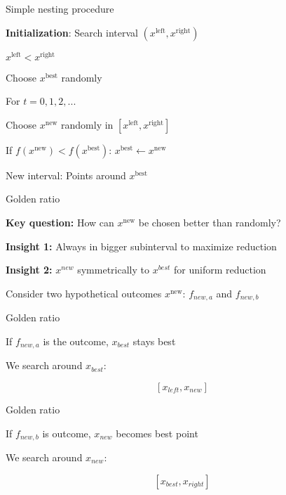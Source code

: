 \documentclass[11pt,compress,t,notes=noshow, xcolor=table]{beamer}
\begin{document}
\begin{framei}{Simple nesting procedure}
  \item \textbf{Initialization}: Search interval $(x^{\text{left}}, x^{\text{right}})$
  \item $x^{\text{left}} < x^{\text{right}}$
  \item Choose $x^{\text{best}}$ randomly
  \item For $t = 0, 1, 2, ...$
  \item Choose $x^{\text{new}}$ randomly in $[x^{\text{left}}, x^{\text{right}}]$
  \item If $f(x^{\text{new}}) < f(x^{\text{best}})$: $x^{\text{best}} \leftarrow x^{\text{new}}$
  \item New interval: Points around $x^{\text{best}}$
  \vfill
\end{framei}


\begin{framei}{Golden ratio}
  \item \textbf{Key question:} How can $x^{\text{new}}$ be chosen better than randomly?
  \item \textbf{Insight 1:} Always in bigger subinterval to maximize reduction
  \item \textbf{Insight 2:} $x^{new}$ symmetrically to $x^{best}$ for uniform reduction
  \vfill
  \vfill
  \item Consider two hypothetical outcomes $x^{\text{new}}$: $f_{new, a}$ and $f_{new, b}$
\end{framei}

\begin{framei}{Golden ratio}
  \item If $f_{new, a}$ is the outcome, $x_{best}$ stays best
  \item We search around $x_{best}$:
  \item $$[x_{left}, x_{new}]$$
  \vfill
\end{framei}

\begin{framei}{Golden ratio}
  \item If $f_{new, b}$ is outcome, $x_{new}$ becomes best point
  \item We search around $x_{new}$:
  \item $$[x_{best}, x_{right}]$$
  \vfill
\end{framei}
\end{document}
